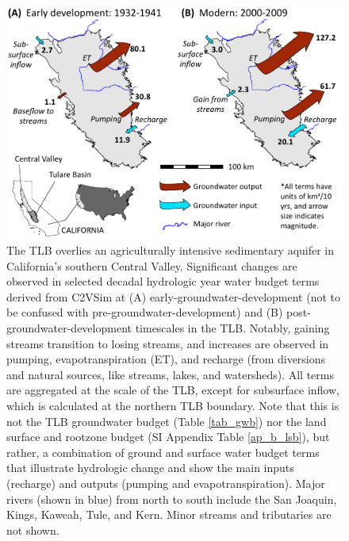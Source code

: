 \begin{figure}[H]
	\centering
	\includegraphics[width=\textwidth]{ch3_figs/study_site_water_budget_riv.pdf}
	\caption{The TLB overlies an agriculturally intensive sedimentary aquifer in California's southern Central Valley. Significant changes are observed in selected decadal hydrologic year water budget terms derived from C2VSim at (A) early-groundwater-development (not to be confused with pre-groundwater-development) and (B) post-groundwater-development timescales in the TLB. Notably, gaining streams transition to losing streams, and increases are observed in pumping, evapotranspiration (ET), and recharge (from diversions and natural sources, like streams, lakes, and watersheds). All terms are aggregated at the scale of the TLB, except for subsurface inflow, which is calculated at the northern TLB boundary. Note that this is not the TLB groundwater budget (Table \ref{tab_gwb}) nor the land surface and rootzone budget (SI Appendix Table \ref{ap_b_lsb}), but rather, a combination of ground and surface water budget terms that illustrate hydrologic change and show the main inputs (recharge) and outputs (pumping and evapotranspiration). Major rivers (shown in blue) from north to south include the San Joaquin, Kings, Kaweah, Tule, and Kern. Minor streams and tributaries are not shown.}
	\label{fig:tb_study_site}
\end{figure}



\bgroup
\centering
\setlength{\tabcolsep}{1.4em}



